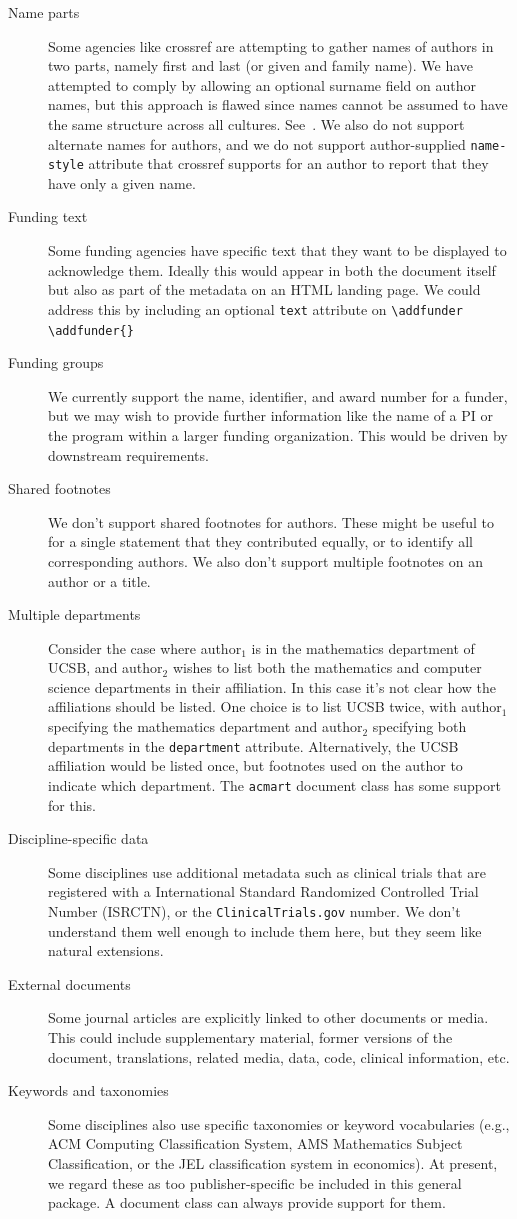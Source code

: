 \documentclass{article}
\newcommand{\cmd}[2][]{%
  \def\FirstArg{#1}%
  \ifx\FirstArg\empty%
    \texttt{\textbackslash{}#2}%
  \else%
    \texttt{\textbackslash{}#2\{#1\}}%
  \fi
}
\newcommand{\pkg}[1]{\texttt{#1}}
\begin{document}
\begin{description}
\item[Name parts] Some agencies like crossref are attempting to gather names of authors in
two parts, namely first and last (or given and family name). We have
attempted to comply by allowing an optional surname field on author
names, but this approach is flawed since names cannot be assumed to
have the same structure across all cultures. See~\cite{falsehoods}.
We also do not support alternate names for authors, and we do not support
author-supplied \texttt{name-style} attribute that crossref supports for an author to report
that they have only a given name.
\item[Funding text] Some funding agencies have specific text that they want to
be displayed to acknowledge them. Ideally this would appear in both the document itself but
also as part of the metadata on an HTML landing page. We could address this by including an optional
\texttt{text} attribute on \cmd{addfunder}
\item[Funding groups] We currently support the name, identifier, and award number for a funder,
but we may wish to provide further information like the name of a PI or the
program within a larger funding organization. This would be driven by downstream requirements.
\item[Shared footnotes] We don't support shared footnotes for authors. These might be useful to
for a single statement that they contributed equally, or to identify all corresponding authors.
We also don't support
multiple footnotes on an author or a title.
\item[Multiple departments] Consider the case where author$_1$ is in the mathematics
department of UCSB, and author$_2$ wishes to list both the mathematics and computer science departments
in their affiliation.  In this case it's not clear how the affiliations should be listed.
One choice is to list UCSB twice, with author$_1$ specifying
the mathematics department and author$_2$ specifying both departments in the \texttt{department}
attribute. Alternatively, the UCSB affiliation would be listed once, but footnotes used on the
author to indicate which department. The \pkg{acmart} document class
has some support for this.
\item[Discipline-specific data] Some disciplines use additional metadata such as
clinical trials that are registered with a International Standard
Randomized Controlled Trial Number (ISRCTN), or the \verb+ClinicalTrials.gov+
number.  We don't understand them well enough to include them
here, but they seem like natural extensions.
\item[External documents] Some journal articles are explicitly linked to
other documents or media. This could include supplementary material,
former versions of the document, translations, related media,
data, code, clinical information, etc. 
\item[Keywords and taxonomies]
Some disciplines also use specific taxonomies or keyword vocabularies (e.g.,
ACM Computing Classification System, AMS Mathematics Subject
Classification, or the JEL classification system in economics).  At
present, we regard these as too publisher-specific be included in this
general package. A document class can always provide support for them.



\end{description}
\end{document}
